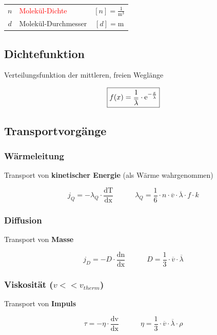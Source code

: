 \begin{tabular}{c l c}
	\rule{0pt}{8pt}$n$ & \textcolor{red}{Molekül-Dichte} & $[n] = \mathrm{\frac{1}{m^3}}$\\	
	$d$ & Molekül-Durchmesser & $[d] = \mathrm{m}$ \\
\end{tabular}




\subsection{Dichtefunktion}
Verteilungsfunktion der mittleren, freien Weglänge 

$$ \boxed{ f(x) = \frac{1}{\overline{\lambda}} \cdot \mathrm{e}^{- \frac{x}{\overline{\lambda}}}  } $$


\subsection{Transportvorgänge}

\subsubsection{Wärmeleitung}
Transport von \textbf{kinetischer Energie} (als Wärme wahrgenommen)

$$ \boxed{ j_Q = - \lambda_Q \cdot \frac{\mathrm{dT}}{\mathrm{dx}} \qquad \quad \lambda_Q = \frac{1}{6} \cdot n \cdot \overline{v} \cdot \overline{\lambda} \cdot f \cdot k }  $$




\subsubsection{Diffusion}
Transport von \textbf{Masse} 


$$ \boxed{ j_D = -D \cdot \frac{\mathrm{dn}}{\mathrm{dx}} \qquad \quad  D = \frac{1}{3} \cdot \overline{v} \cdot \overline{\lambda} }  $$



\subsubsection{Viskosität ($v << v_{therm}$)}
Transport von \textbf{Impuls} 


$$ \boxed{ \tau = - \eta \cdot \frac{\mathrm{dv}}{\mathrm{dx}} \qquad \quad  \eta = \frac{1}{3} \cdot \overline{v} \cdot \overline{\lambda} \cdot \rho }  $$


